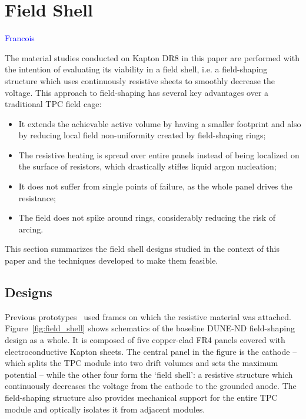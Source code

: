 \documentclass[a4paper,12pt]{article}
\begin{document}


\section{Field Shell}
\label{sec:field_shell}
\textcolor{blue}{Francois}

The material studies conducted on Kapton DR8 in this paper are performed with the intention of evaluating its viability in a field shell, i.e. a field-shaping structure which uses continuously resistive sheets to smoothly decrease the voltage. This approach to field-shaping has several key advantages over a traditional TPC field cage:
\begin{itemize}
\item It extends the achievable active volume by having a smaller footprint and also by reducing local field non-uniformity created by field-shaping rings;
\item The resistive heating is spread over entire panels instead of being localized on the surface of resistors, which drastically stifles liquid argon nucleation;
\item It does not suffer from single points of failure, as the whole panel drives the resistance;
\item The field does not spike around rings, considerably reducing the risk of arcing.
\end{itemize}
This section summarizes the field shell designs studied in the context of this paper and the techniques developed to make them feasible.

\subsection{Designs}
Previous prototypes~\cite{bern_lartpc,srmu_tpc} used frames on which the resistive material was attached. Figure~\ref{fig:field_shell} shows schematics of the baseline DUNE-ND field-shaping design as a whole. It is composed of five copper-clad FR4 panels covered with electroconductive Kapton sheets. The central panel in the figure is the cathode -- which splits the TPC module into two drift volumes and sets the maximum potential -- while the other four form the `field shell': a resistive structure which continuously decreases the voltage from the cathode to the grounded anode. The field-shaping structure also provides mechanical support for the entire TPC module and optically isolates it from adjacent modules.
\end{document}
